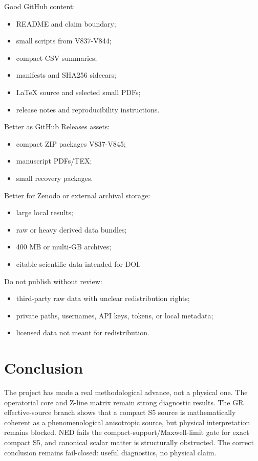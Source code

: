 \documentclass[11pt,a4paper]{article}
\begin{document}
Good GitHub content:

\begin{itemize}
\item README and claim boundary;
\item small scripts from V837-V844;
\item compact CSV summaries;
\item manifests and SHA256 sidecars;
\item LaTeX source and selected small PDFs;
\item release notes and reproducibility instructions.
\end{itemize}

Better as GitHub Releases assets:

\begin{itemize}
\item compact ZIP packages V837-V845;
\item manuscript PDFs/TEX;
\item small recovery packages.
\end{itemize}

Better for Zenodo or external archival storage:

\begin{itemize}
\item large local results;
\item raw or heavy derived data bundles;
\item 400 MB or multi-GB archives;
\item citable scientific data intended for DOI.
\end{itemize}

Do not publish without review:

\begin{itemize}
\item third-party raw data with unclear redistribution rights;
\item private paths, usernames, API keys, tokens, or local metadata;
\item licensed data not meant for redistribution.
\end{itemize}

\section{Conclusion}

The project has made a real methodological advance, not a physical one. The operatorial core and Z-line matrix remain strong diagnostic results. The GR effective-source branch shows that a compact S5 source is mathematically coherent as a phenomenological anisotropic source, but physical interpretation remains blocked. NED fails the compact-support/Maxwell-limit gate for exact compact S5, and canonical scalar matter is structurally obstructed. The correct conclusion remains fail-closed: useful diagnostics, no physical claim.
\end{document}
